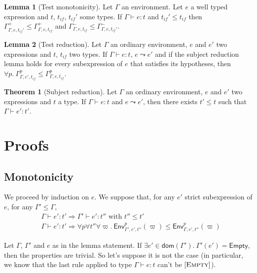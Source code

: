 \documentclass[a4paper]{article}%
\newcommand{\dom}[1]{\textsf{dom}(#1)}
\newcommand{\Empty} {\textsf{Empty}}%
\newcommand{\Gp}[2]{\textsf{Env}^{#1}_{#2}}
\theoremstyle{definition}
\newtheorem{theorem}{Theorem}
\newtheorem{lemma}{Lemma}
\newcommand {\Rule}[1] {[\textsc{#1}]}
\begin{document}
        \begin{lemma}[Test monotonicity]
          Let $\Gamma$ an environment. Let $e$ a well typed expression and $t$, $t_{if}$, $t_{if}'$ some types.
          If $\Gamma \vdash e : t$ and $t_{if}' \leq t_{if}$ then $\Gamma^+_{\Gamma,e,t_{if}'} \leq \Gamma^+_{\Gamma,e,t_{if}}$
          and $\Gamma^-_{\Gamma,e,t_{if}} \leq \Gamma^-_{\Gamma,e,t_{if}'}$.
        \end{lemma}
    
        \begin{lemma}[Test reduction]
          Let $\Gamma$ an ordinary environment, $e$ and $e'$ two expressions and $t$, $t_{if}$ two types.
          If $\Gamma \vdash e : t$, $e \leadsto e'$ and
          if the subject reduction lemma holds for every subexpression of $e$ that satisfies its hypotheses,
          then $\forall p.\ \Gamma^p_{\Gamma,e',t_{if}} \leq \Gamma^p_{\Gamma,e,t_{if}}$.
        \end{lemma}
    
        \begin{theorem}[Subject reduction]
          Let $\Gamma$ an ordinary environment, $e$ and $e'$ two expressions and $t$ a type.
          If $\Gamma \vdash e : t$ and $e \leadsto e'$, then there exists $t' \leq t$ such that $\Gamma \vdash e' : t'$.
        \end{theorem}
    
        \section{Proofs}
    
        \subsection{Monotonicity}
    
        We proceed by induction on $e$. We suppose that, for any $e'$ strict subexpression of $e$, for any $\Gamma' \leq \Gamma$,
        \begin{align*}
          &\Gamma \vdash e':t' \Rightarrow \Gamma' \vdash e':t'' \text{ with } t'' \leq t'\\
          &\Gamma \vdash e':t' \Rightarrow \forall p \forall t'' \forall \varpi.\ \Gp p {\Gamma',e',t''} (\varpi) \leq \Gp p {\Gamma,e',t''} (\varpi)
        \end{align*}
    
        Let $\Gamma$, $\Gamma'$ and $e$ as in the lemma statement.
        If $\exists e' \in \dom {\Gamma'}.\ \Gamma'(e') = \Empty$, then the properties are trivial.
        So let's suppose it is not the case (in particular, we know that the last rule applied to type $\Gamma \vdash e:t$ can't be $\Rule{Empty}$).
    
\end{document}
